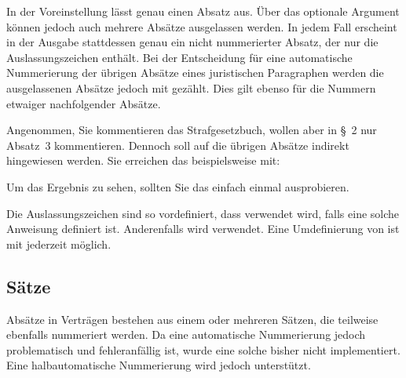 In der Voreinstellung lässt  genau
einen Absatz aus. Über das optionale Argument  können jedoch
auch mehrere Absätze ausgelassen werden. In jedem Fall erscheint in der
Ausgabe stattdessen genau ein nicht nummerierter Absatz, der nur die
Auslassungszeichen  enthält. Bei der Entscheidung für eine
automatische Nummerierung der übrigen Absätze eines juristischen Paragraphen
werden die ausgelassenen Absätze jedoch mit gezählt. Dies gilt ebenso für die
Nummern etwaiger nachfolgender Absätze.
\begin{Example}
  Angenommen, Sie kommentieren das Strafgesetzbuch, wollen aber in \S~2 nur
  Absatz~3 kommentieren. Dennoch soll auf die übrigen Absätze indirekt
  hingewiesen werden. Sie erreichen das beispielsweise mit:
  Um das Ergebnis zu sehen, sollten Sie das einfach einmal ausprobieren.
\end{Example}

Die Auslassungszeichen sind so vordefiniert, dass
 verwendet wird, falls eine solche
Anweisung definiert ist. Anderenfalls wird 
verwendet. Eine Umdefinierung von  ist mit
 jederzeit möglich.%
\EndIndexGroup


\subsection{Sätze}
\label{sec:scrjura.sentence}

\BeginIndexGroup
{}%
Absätze in Verträgen bestehen aus einem oder mehreren Sätzen, die teilweise
ebenfalls nummeriert werden. Da eine automatische Nummerierung jedoch
problematisch und fehleranfällig ist, wurde eine solche bisher nicht
implementiert. Eine halbautomatische Nummerierung wird jedoch unterstützt.


